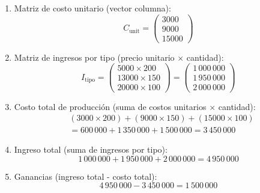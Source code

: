 \begin{myproof}
\begin{enumerate}[$(a)$]
\item Matriz de costo unitario (vector columna):
\[
C_{\text{unit}} = \begin{pmatrix}
3000 \\
9000 \\
15000
\end{pmatrix}
\]

\item Matriz de ingresos por tipo (precio unitario $\times$ cantidad):
\[
I_{\text{tipo}} = \begin{pmatrix}
5000 \times 200 \\
13000 \times 150 \\
20000 \times 100
\end{pmatrix} = \begin{pmatrix}
1\,000\,000 \\
1\,950\,000 \\
2\,000\,000
\end{pmatrix}
\]

\item Costo total de producción (suma de costos unitarios $\times$ cantidad):
\begin{align*}
&(3000 \times 200) + (9000 \times 150) + (15000 \times 100) \\
&= 600\,000 + 1\,350\,000 + 1\,500\,000 = \boxed{3\,450\,000}
\end{align*}

\item Ingreso total (suma de ingresos por tipo):
\[
1\,000\,000 + 1\,950\,000 + 2\,000\,000 = \boxed{4\,950\,000}
\]

\item Ganancias (ingreso total - costo total):
\[
4\,950\,000 - 3\,450\,000 = \boxed{1\,500\,000}
\]
\end{enumerate}
\end{myproof}

